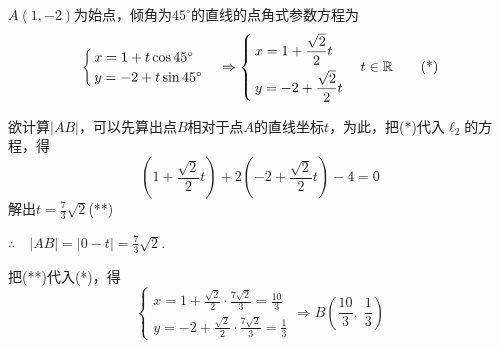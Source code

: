 \begin{solution}
    $A(1,-2)$为始点，倾角为$45^{\circ}$的直线的点角式参数方程为
\begin{equation}
    \begin{cases}
        x=1+t\cos45^{\circ} \\ y=-2+t\sin 45^{\circ}
    \end{cases}\Rightarrow \begin{cases}
        x=1+\dfrac{\sqrt{2}}{2}t\\[1.5ex]
        y=-2+\dfrac{\sqrt{2}}{2}t
    \end{cases}t\in\mathbb{R} \tag{*}
\end{equation}
\begin{enumerate}[(1)]
\noindent
\begin{minipage}{.45\textwidth}
\item 欲计算$|AB|$，可以先算出点$B$相对于点$A$的直线坐标$t$，为此，把(*)代入$\ell_2$的方程，得
\[\left(1+\frac{\sqrt{2}}{2}t\right)+2\left(-2+\frac{\sqrt{2}}{2}t\right)-4=0\]
解出$t=\frac{7}{3}\sqrt{2}$\hfill (**)

$\therefore\quad |AB|=|0-t|=\frac{7}{3}\sqrt{2}$.
\end{minipage}
\hfill
\begin{minipage}{.5\textwidth}
\centering
{}
\end{minipage}


    
\item 把(**)代入(*)，得
\[\begin{cases}
    x=1+\frac{\sqrt{2}}{2}\cdot\frac{7\sqrt{2}}{3}=\frac{10}{3}\\[1.5ex]
    y=-2+\frac{\sqrt{2}}{2}\cdot \frac{7\sqrt{2}}{3}=\frac{1}{3}
\end{cases}\Rightarrow B\left(\frac{10}{3},\; \frac{1}{3}\right)\]
\end{enumerate}
\end{solution}

